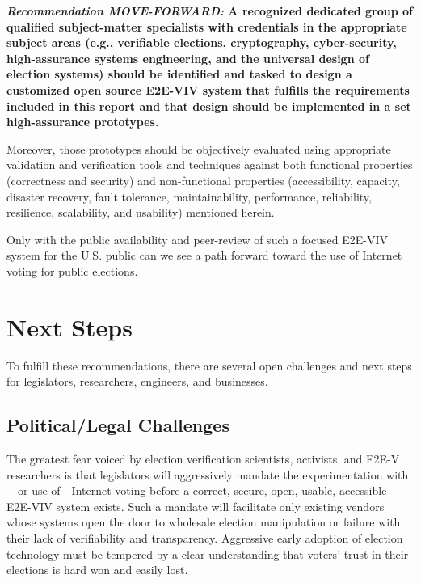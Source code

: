 \begin{center}
  \textbf{\emph{Recommendation MOVE-FORWARD:} A recognized dedicated
    group of qualified subject-matter specialists with credentials in
    the appropriate subject areas (e.g., verifiable elections,
    cryptography, cyber-security, high-assurance systems engineering,
    and the universal design of election systems) should be identified
    and tasked to design a customized open source E2E-VIV system that
    fulfills the requirements included in this report and that design
    should be implemented in a set high-assurance prototypes.}
\end{center}

Moreover, those prototypes should be objectively evaluated using
appropriate validation and verification tools and techniques against
both functional properties (correctness and security) and
non-functional properties (accessibility, capacity, disaster recovery,
fault tolerance, maintainability, performance, reliability,
resilience, scalability, and usability) mentioned herein.

Only with the public availability and peer-review of such a focused
E2E-VIV system for the U.S. public can we see a path forward
toward the use of Internet voting for public elections.

\section{Next Steps}
\label{sec:next-steps}

To fulfill these recommendations, there are several open challenges
and next steps for legislators, researchers, engineers, and
businesses.

\subsection{Political/Legal Challenges}

The greatest fear voiced by election verification scientists,
activists, and E2E-V researchers is that legislators will aggressively
mandate the experimentation with---or use of---Internet voting before
a correct, secure, open, usable, accessible E2E-VIV system
exists. Such a mandate will facilitate only existing vendors whose
systems open the door to wholesale election manipulation or failure
with their lack of verifiability and transparency. Aggressive early
adoption of election technology must be tempered by a clear
understanding that voters' trust in their elections is hard won and
easily lost.

